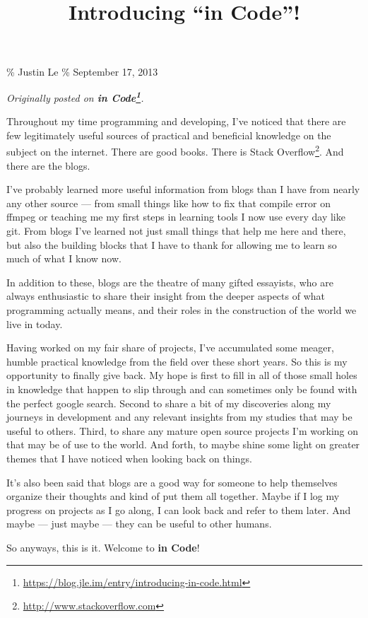 \documentclass[]{article}
\title{Introducing ``in Code''!}
\renewcommand{\href}[2]{#2\footnote{\url{#1}}}
\begin{document}
\maketitle

\% Justin Le \% September 17, 2013

\emph{Originally posted on
\textbf{\href{https://blog.jle.im/entry/introducing-in-code.html}{in Code}}.}

Throughout my time programming and developing, I've noticed that there are few
legitimately useful sources of practical and beneficial knowledge on the subject
on the internet. There are good books. There is
\href{http://www.stackoverflow.com}{Stack Overflow}. And there are the blogs.

I've probably learned more useful information from blogs than I have from nearly
any other source --- from small things like how to fix that compile error on
ffmpeg or teaching me my first steps in learning tools I now use every day like
git. From blogs I've learned not just small things that help me here and there,
but also the building blocks that I have to thank for allowing me to learn so
much of what I know now.

In addition to these, blogs are the theatre of many gifted essayists, who are
always enthusiastic to share their insight from the deeper aspects of what
programming actually means, and their roles in the construction of the world we
live in today.

Having worked on my fair share of projects, I've accumulated some meager, humble
practical knowledge from the field over these short years. So this is my
opportunity to finally give back. My hope is first to fill in all of those small
holes in knowledge that happen to slip through and can sometimes only be found
with the perfect google search. Second to share a bit of my discoveries along my
journeys in development and any relevant insights from my studies that may be
useful to others. Third, to share any mature open source projects I'm working on
that may be of use to the world. And forth, to maybe shine some light on greater
themes that I have noticed when looking back on things.

It's also been said that blogs are a good way for someone to help themselves
organize their thoughts and kind of put them all together. Maybe if I log my
progress on projects as I go along, I can look back and refer to them later. And
maybe --- just maybe --- they can be useful to other humans.

So anyways, this is it. Welcome to \textbf{in Code}!
\end{document}
